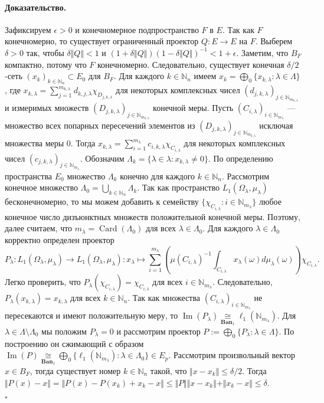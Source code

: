 \documentclass[12pt]{article}
\newcommand{\isom}[1]{\mathop{\mathbin{\cong}}\limits_{#1}}
\renewenvironment{proof}{\paragraph{Доказательство.}}{\hfill$\square$\medskip}
\begin{document}
\begin{proof}
Зафиксируем $\epsilon>0$ и конечномерное подпространство $F$ в $E$. Так как $F$ конечномерно, то существует ограниченный проектор $Q:E\to E$ на $F$. Выберем $\delta>0$ так, чтобы $\delta\Vert Q\Vert<1$ и $(1+\delta\Vert Q\Vert)(1-\delta\Vert Q\Vert)^{-1}<1+\epsilon$. Заметим, что $B_F$ компактно, потому что $F$ конечномерно. Следовательно, существует конечная $\delta/2$-сеть $(x_k)_{k\in\mathbb{N}_n}\subset E_0$ для $B_F$. Для каждого $k\in\mathbb{N}_n$ имеем $x_k=\bigoplus_0\{x_{k,\lambda}:\lambda\in\Lambda\}$, где $x_{k,\lambda}=\sum_{j=1}^{m_{k,\lambda}}d_{k,j,\lambda}\chi_{D_{j,k,\lambda}}$ для некоторых комплексных чисел $(d_{j,k,\lambda})_{j\in\mathbb{N}_{m_{k,\lambda}}}$ и измеримых множеств $(D_{j,k,\lambda})_{j\in\mathbb{N}_{m_{k,\lambda}}}$ конечной меры. Пусть $(C_{i,\lambda})_{i\in\mathbb{N}_{m_\lambda}}$ --- множество всех попарных пересечений элементов из $(D_{j,k,\lambda})_{j\in\mathbb{N}_{m_{k,\lambda}}}$ исключая множества меры $0$. Тогда $x_{k,\lambda}=\sum_{i=1}^{m_\lambda} c_{i,k,\lambda}\chi_{C_{i,\lambda}}$ для некоторых комплексных чисел $(c_{j,k,\lambda})_{j\in\mathbb{N}_{m_{\lambda}}}$. Обозначим $\Lambda_k=\{\lambda\in\lambda:x_{k,\lambda}\neq 0\}$. По определению пространства $E_0$ множество $\Lambda_k$ конечно для каждого $k\in\mathbb{N}_n$. Рассмотрим конечное множество $\Lambda_0=\bigcup_{k\in\mathbb{N}_n}\Lambda_k$. Так как пространство $L_1(\Omega_\lambda, \mu_\lambda)$ бесконечномерно, то мы можем добавить к семейству $\{\chi_{C_{i,\lambda}}:i\in\mathbb{N}_{m_\lambda}\}$ любое конечное число дизъюнктных множеств положительной конечной меры. Поэтому, далее считаем, что $m_\lambda=\operatorname{Card}(\Lambda_0)$ для всех $\lambda\in\Lambda_0$. Для каждого $\lambda\in\Lambda_0$ корректно определен проектор 
$$
P_\lambda:L_1(\Omega_\lambda,\mu_\lambda)\to L_1(\Omega_\lambda,\mu_\lambda):x_\lambda\mapsto \sum_{i=1}^{m_\lambda}\left( \mu(C_{i,\lambda})^{-1}\int_{C_{i,\lambda}}x_\lambda(\omega)d\mu_\lambda(\omega)\right)\chi_{C_{i,\lambda}}.
$$
Легко проверить, что $P_\lambda(\chi_{C_{i,\lambda}})=\chi_{C_{i,\lambda}}$ для всех $i\in\mathbb{N}_{m_\lambda}$. Следовательно, $P_\lambda(x_{k,\lambda})=x_{k,\lambda}$ для всех $k\in\mathbb{N}_n$. Так как множества $(C_{i,\lambda})_{i\in\mathbb{N}_{m_\lambda}}$ не пересекаются и имеют положительную меру, то $\operatorname{Im}(P_\lambda)\isom{\mathbf{Ban}_1}\ell_1(\mathbb{N}_{m_\lambda})$. Для $\lambda\in\Lambda\setminus\Lambda_0$ мы положим $P_\lambda=0$ и рассмотрим проектор $P:=\bigoplus_0\{P_\lambda:\lambda\in\Lambda\}$. По построению он сжимающий с образом $\operatorname{Im}(P)\isom{\mathbf{Ban}_1}\bigoplus_0\{\ell_1(\mathbb{N}_{m_\lambda}):\lambda\in\Lambda_0\}\in E_{p}$. Рассмотрим произвольный вектор $x\in B_F$, тогда существует номер $k\in\mathbb{N}_n$ такой, что $\Vert x-x_k\Vert\leq \delta/2$. Тогда $\Vert P(x)-x\Vert=\Vert P(x)-P(x_k)+x_k-x\Vert\leq\Vert P\Vert\Vert x-x_k\Vert+\Vert x_k-x\Vert\leq\delta$.


\end{proof}
\end{document}
